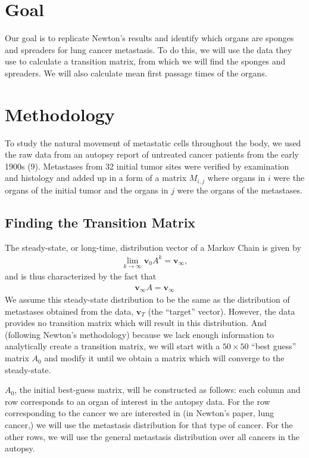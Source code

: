 \documentclass[letterpaper,12pt]{article}
\newcommand{\vect}[1]{\boldsymbol{#1}}
\begin{document}
\section{Goal}

Our goal is to replicate Newton's results and identify which organs are sponges and spreaders for lung cancer metastasis. To do this, we will use the data they use to calculate a transition matrix, from which we will find the sponges and spreaders. We will also calculate mean first passage times of the organs.

\section{Methodology}

To study the natural movement of metastatic cells throughout the body, we used the raw data from an autopsy report of untreated cancer patients from the early 1900s (9). Metastases from 32 initial tumor sites were verified by examination and histology and added up in a form of a matrix $M_{i,j}$ where organs in $i$ were the organs of the initial tumor and the organs in $j$ were the organs of the metastases.

\subsection{Finding the Transition Matrix}

The steady-state, or long-time, distribution vector of a Markov Chain is given by 
\begin{align}
\lim_{k \to \infty} \vect{v}_0 A^k = \vect{v}_\infty,
\end{align}
and is thus characterized by the fact that
\begin{align}
\vect{v}_\infty A = \vect{v}_\infty
\end{align}
We assume this steady-state distribution to be the same as the distribution of metastases obtained from the data, $\vect{v}_T$ (the ``target'' vector). However, the data provides no transition matrix which will result in this distribution. And (following Newton's methodology) because we lack enough information to analytically create a transition matrix, we will start with a $50 \times 50$ ``best guess'' matrix $A_0$ and modify it until we obtain a matrix which will converge to the steady-state.

$A_0$, the initial best-guess matrix, will be constructed as follows: each column and row corresponds to an organ of interest in the autopsy data. For the row corresponding to the cancer we are interested in (in Newton's paper, lung cancer,) we will use the metastasis distribution for that type of cancer. For the other rows, we will use the general metastasis distribution over all cancers in the autopsy.
\end{document}

